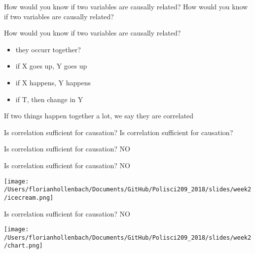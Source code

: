 \documentclass[presentation]{beamer}
\begin{document}
\begin{frame}[label={sec:orgbe7b179}]{How would you know if two variables are causally related?}
\Large{How would you know if two variables are causally related?}
\end{frame}


\begin{frame}[label={sec:orgb934b50}]{How would you know if two variables are causally related?}
\begin{itemize}
\item they occurr together?
\item if X goes up, Y goes up
\item if X happens, Y happens
\item if T, then change in Y
\end{itemize}


\pause
If two things happen together a lot, we say they are correlated
\end{frame}

\begin{frame}[label={sec:org5b6d5fa}]{Is correlation sufficient for causation?}
\Large{Is correlation sufficient for causation?}
\end{frame}

\begin{frame}[label={sec:orgdacefdf}]{Is correlation sufficient for causation?}
\LARGE{NO}
\end{frame}

\begin{frame}[label={sec:orgdcac148}]{Is correlation sufficient for causation?}
\LARGE{NO}

\begin{center}
\texttt{[image: /Users/florianhollenbach/Documents/GitHub/Polisci209\_2018/slides/week2/icecream.png]}
\end{center}
\end{frame}


\begin{frame}[label={sec:org0bdc31e}]{Is correlation sufficient for causation?}
\LARGE{NO}

\begin{center}
\texttt{[image: /Users/florianhollenbach/Documents/GitHub/Polisci209\_2018/slides/week2/chart.png]}
\end{center}
\end{frame}
\end{document}
